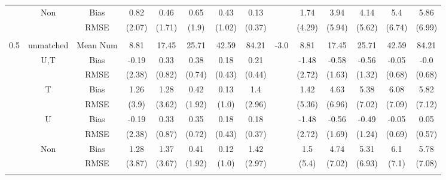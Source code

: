\begin{tabular}{@{\extracolsep{5pt}}lc|cccccc|lccccc}
 & Non & Bias & 0.82 & 0.46 & 0.65 & 0.43 & 0.13 &  & 1.74 & 3.94 & 4.14 & 5.4 & 5.86 \\
 &  & RMSE & (2.07) & (1.71) & (1.9) & (1.02) & (0.37) &  & (4.29) & (5.94) & (5.62) & (6.74) & (6.99) \\
 &  &  &  &  &  &  &  &  &  &  &  &  &  \\
0.5 & unmatched & Mean Num & 8.81 & 17.45 & 25.71 & 42.59 & 84.21 & -3.0 & 8.81 & 17.45 & 25.71 & 42.59 & 84.21 \\
 & U,T & Bias & -0.19 & 0.33 & 0.38 & 0.18 & 0.21 &  & -1.48 & -0.58 & -0.56 & -0.05 & -0.0 \\
 &  & RMSE & (2.38) & (0.82) & (0.74) & (0.43) & (0.44) &  & (2.72) & (1.63) & (1.32) & (0.68) & (0.68) \\
 & T & Bias & 1.26 & 1.28 & 0.42 & 0.13 & 1.4 &  & 1.42 & 4.63 & 5.38 & 6.08 & 5.82 \\
 &  & RMSE & (3.9) & (3.62) & (1.92) & (1.0) & (2.96) &  & (5.36) & (6.96) & (7.02) & (7.09) & (7.12) \\
 & U & Bias & -0.19 & 0.33 & 0.35 & 0.18 & 0.18 &  & -1.48 & -0.56 & -0.49 & -0.05 & 0.05 \\
 &  & RMSE & (2.38) & (0.87) & (0.72) & (0.43) & (0.37) &  & (2.72) & (1.69) & (1.24) & (0.69) & (0.57) \\
 & Non & Bias & 1.28 & 1.37 & 0.41 & 0.12 & 1.42 &  & 1.5 & 4.74 & 5.31 & 6.1 & 5.78 \\
 &  & RMSE & (3.87) & (3.67) & (1.92) & (1.0) & (2.97) &  & (5.4) & (7.02) & (6.93) & (7.1) & (7.08) \\
 &  &  &  &  &  &  &  &  &  &  &  &  &  \\
\hline 
\bottomrule 
\end{tabular}
